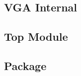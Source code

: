 \documentclass[french]{nakrule}
\begin{document}
\subsection{VGA Internal}

\clearpage
\subsection{Top Module}


\subsection{Package}

\end{document}

